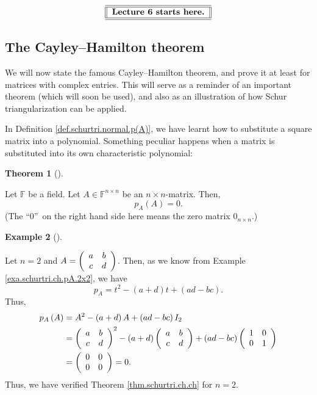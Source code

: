 \documentclass[numbers=enddot,12pt,final,onecolumn,notitlepage]{scrartcl}%
\numberwithin{exer}{subsection}
\theoremstyle{definition}
\newtheorem{theo}{Theorem}[subsection]
\newenvironment{theorem}[1][]
{\begin{theo}[#1]\begin{leftbar}}
{\end{leftbar}\end{theo}}
\newtheorem{exam}[theo]{Example}
\newenvironment{example}[1][]
{\begin{exam}[#1]\begin{leftbar}}
{\end{leftbar}\end{exam}}
\begin{document}
%

\[%
\begin{tabular}
[c]{||l||}\hline\hline
\textbf{Lecture 6 starts here.}\\\hline\hline
\end{tabular}
\]


\subsection{The Cayley--Hamilton theorem}

We will now state the famous Cayley--Hamilton theorem, and prove it at least
for matrices with complex entries. This will serve as a reminder of an
important theorem (which will soon be used), and also as an illustration of
how Schur triangularization can be applied.

In Definition \ref{def.schurtri.normal.p(A)}, we have learnt how to substitute
a square matrix into a polynomial. Something peculiar happens when a matrix is
substituted into its own characteristic polynomial:

\begin{theorem}
[Cayley--Hamilton theorem]\label{thm.schurtri.ch.ch}Let $\mathbb{F}$ be a
field. Let $A\in\mathbb{F}^{n\times n}$ be an $n\times n$-matrix. Then,%
\[
p_{A}\left(  A\right)  =0.
\]
(The \textquotedblleft$0$\textquotedblright\ on the right hand side here means
the zero matrix $0_{n\times n}$.)
\end{theorem}

\begin{example}
Let $n=2$ and $A=\left(
\begin{array}
[c]{cc}%
a & b\\
c & d
\end{array}
\right)  $. Then, as we know from Example \ref{exa.schurtri.ch.pA.2x2}, we
have%
\[
p_{A}=t^{2}-\left(  a+d\right)  t+\left(  ad-bc\right)  .
\]
Thus,%
\begin{align*}
p_{A}\left(  A\right)   &  =A^{2}-\left(  a+d\right)  A+\left(  ad-bc\right)
I_{2}\\
&  =\left(
\begin{array}
[c]{cc}%
a & b\\
c & d
\end{array}
\right)  ^{2}-\left(  a+d\right)  \left(
\begin{array}
[c]{cc}%
a & b\\
c & d
\end{array}
\right)  +\left(  ad-bc\right)  \left(
\begin{array}
[c]{cc}%
1 & 0\\
0 & 1
\end{array}
\right) \\
&  =\left(
\begin{array}
[c]{cc}%
0 & 0\\
0 & 0
\end{array}
\right)  =0.
\end{align*}
Thus, we have verified Theorem \ref{thm.schurtri.ch.ch} for $n=2$.
\end{example}
\end{document}
